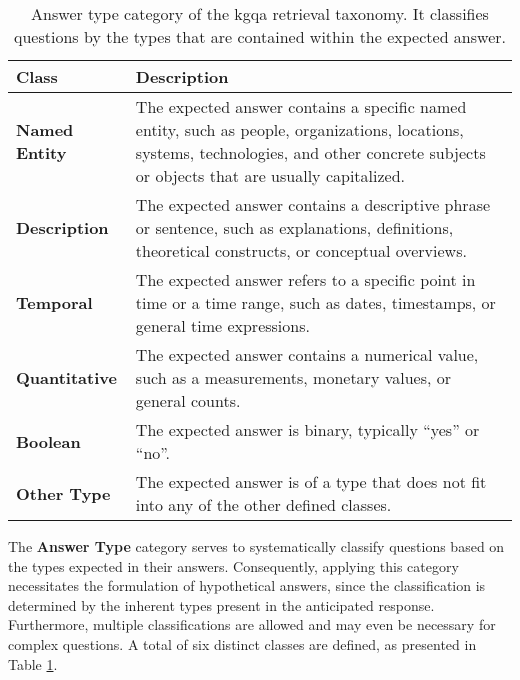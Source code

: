 \begin{table}[t]
    \centering
    \begin{tabular}{@{}lp{8cm}@{}}
        \toprule
        \textbf{Class} & \textbf{Description} \\
        \midrule
        \textbf{Named Entity}
            & The expected answer contains a specific named entity, such as people, organizations, locations, systems, technologies, and other concrete subjects or objects that are usually capitalized. \\
        \cmidrule(l){1-2}
            \textbf{Description}
            & The expected answer contains a descriptive phrase or sentence, such as explanations, definitions, theoretical constructs, or conceptual overviews. \\
        \cmidrule(l){1-2}
            \textbf{Temporal}
            & The expected answer refers to a specific point in time or a time range, such as dates, timestamps, or general time expressions. \\
        \cmidrule(l){1-2}
            \textbf{Quantitative}
            & The expected answer contains a numerical value, such as a measurements, monetary values, or general counts. \\
        \cmidrule(l){1-2}
            \textbf{Boolean}
            & The expected answer is binary, typically \enquote{yes} or \enquote{no}. \\
        \cmidrule(l){1-2}
            \textbf{Other Type}
            & The expected answer is of a type that does not fit into any of the other defined classes. \\
        \bottomrule
    \end{tabular}
    \caption[Answer Type Category of the Taxonomy]{Answer type category of the \gls{kgqa} retrieval taxonomy. It classifies questions by the types that are contained within the expected answer.}
    \label{tab:answer_type}
\end{table}

The \textbf{Answer Type} category serves to systematically classify questions based on the types expected in their answers. Consequently, applying this category necessitates the formulation of hypothetical answers, since the classification is determined by the inherent types present in the anticipated response. Furthermore, multiple classifications are allowed and may even be necessary for complex questions. A total of six distinct classes are defined, as presented in Table \ref{tab:answer_type}.

